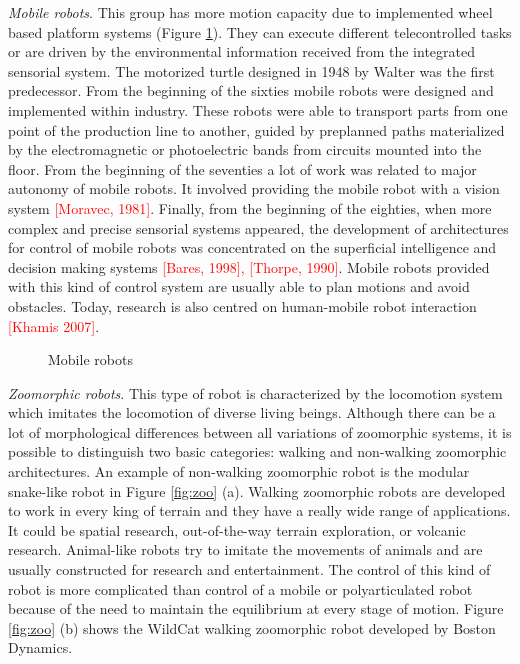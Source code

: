 \textit{Mobile robots}. This group has more motion capacity due to implemented wheel based platform systems (Figure \ref{fig:mobile}). They can execute different telecontrolled tasks or are driven by the environmental information received from the integrated sensorial system. The motorized turtle designed in 1948 by Walter was the first predecessor. From the beginning of the sixties mobile robots were designed and implemented within industry. These robots were able to transport parts from one point of the production line to another, guided by preplanned paths materialized by the electromagnetic or photoelectric bands from circuits mounted into the floor. From the beginning of the seventies a lot of work was related to major autonomy of mobile robots. It involved providing the mobile robot with a vision system \textcolor{red}{[Moravec, 1981]}. Finally, from the beginning of the eighties, when more complex and precise sensorial systems appeared, the development of architectures for control of mobile robots was concentrated on the superficial intelligence and decision making systems \textcolor{red}{[Bares, 1998], [Thorpe, 1990]}. Mobile robots provided with this kind of control system are usually able to plan motions and avoid obstacles. Today, research is also centred on human-mobile robot interaction \textcolor{red}{[Khamis 2007]}. 

\begin{figure}[!hbt]
\centering
{}\hspace{10mm}
\caption{Mobile robots}
\label{fig:mobile}
\end{figure}

\textit{Zoomorphic robots}. This type of robot is characterized by the locomotion system which imitates the locomotion of diverse living beings. Although there can be a lot of morphological differences between all variations of zoomorphic systems, it is possible to distinguish two basic categories: walking and non-walking zoomorphic architectures. An example of non-walking zoomorphic robot is the modular snake-like robot in Figure \ref{fig:zoo} (a). Walking zoomorphic robots are developed to work in every king of terrain and they have a really wide range of applications. It could be spatial research, out-of-the-way terrain exploration, or volcanic research. Animal-like robots try to imitate the movements of animals and are usually constructed for research and entertainment. The control of this kind of robot is more complicated than control of a mobile or polyarticulated robot because of the need to maintain the equilibrium at every stage of motion. Figure \ref{fig:zoo} (b) shows the WildCat walking zoomorphic robot developed by Boston Dynamics.

